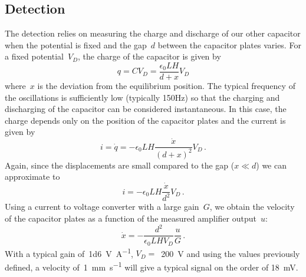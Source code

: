 \subsection{Detection}
\label{sec.detection}
The detection relies on measuring the charge and discharge of our other capacitor when the potential is fixed and the gap~$d$ between the capacitor plates varies. For a fixed potential~$V_D$, the charge of the capacitor is given by
\begin{equation}
q  = C V_D = \frac{\epsilon_0 L H}{d+x} V_D
\end{equation}
where~$x$ is the deviation from the equilibrium position. The typical frequency of the oscillations is sufficiently low (typically 150Hz) so that the charging and discharging of the capacitor can be considered instantaneous. In this case, the charge depends only on the position of the capacitor plates and the current is given by
\begin{equation}
i = \dot{q}  = -\epsilon_0 L H\frac{\dot{x}}{(d+x)^2} V_D \,.
\end{equation}
Again, since the displacements are small compared to the gap ($x\ll d$) we can approximate to
\begin{equation}
i = -\epsilon_0 L H\frac{\dot{x}}{d^2} V_D \,.
\end{equation}
Using a current to voltage converter with a large gain~$G$, we obtain the velocity of the capacitor plates as a function of the measured amplifier output~$u$:
\begin{equation}
\label{eq.linearoutput}
\dot{x} = -\frac{d^2}{\epsilon_0 L H V_D} \frac{u}{G} \,.
\end{equation}
With a typical gain of~\si{\num{1d6}\volt\per\ampere}, $V_D=$~\si{\num{200}\volt} and using the values previously defined, a velocity of~\si{\num{1}\milli\meter\per\second} will give a typical signal on the order of \si{\num{18}\milli\volt}.

